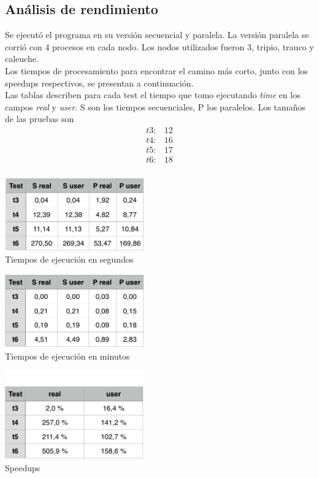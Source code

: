 \documentclass[10pt]{extarticle}
\begin{document}
\subsection*{Análisis de rendimiento}
Se ejecutó el programa en su versión secuencial y paralela. La versión paralela se corrió con 4 procesos en cada nodo. Los nodos utilizados fueron 3, tripio, trauco y caleuche.\\
Los tiempos de procesamiento para encontrar el camino más corto, junto con los speedups respectivos, se presentan a continuación.\\
Las tablas describen para cada test el tiempo que tomo ejecutando \textit{time} en los campos \textit{real} y \textit{user}. S son los tiempos secuenciales, P los paralelos.
Los tamaños de las pruebas son
\begin{align*}
 t3: & 12 \\
 t4: & 16 \\
 t5: & 17 \\
 t6: & 18 \\
\end{align*}
\begin{center}
 \includegraphics[width=6cm]{imgs/table_seconds.png}\\
 \footnotesize{Tiempos de ejecución en segundos}\\
\end{center}

\begin{center}
 \includegraphics[width=6cm]{imgs/table_minutes.png}\\
 \footnotesize{Tiempos de ejecución en minutos}\\
\end{center}

\begin{center}
 \includegraphics[width=6cm]{imgs/table_speedup.png}\\
 \footnotesize{Speedups}\\
\end{center}
\end{document}
